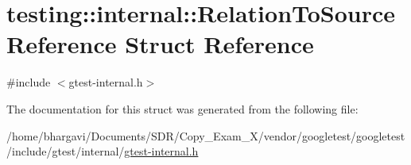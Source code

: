 \hypertarget{structtesting_1_1internal_1_1_relation_to_source_reference}{}\section{testing\+:\+:internal\+:\+:Relation\+To\+Source\+Reference Struct Reference}
\label{structtesting_1_1internal_1_1_relation_to_source_reference}


{\ttfamily \#include $<$gtest-\/internal.\+h$>$}



The documentation for this struct was generated from the following file\+:\begin{DoxyCompactItemize}
\item 
/home/bhargavi/\+Documents/\+S\+D\+R/\+Copy\+\_\+\+Exam\+\_\+X/vendor/googletest/googletest/include/gtest/internal/\hyperlink{gtest-internal_8h}{gtest-\/internal.\+h}\end{DoxyCompactItemize}

